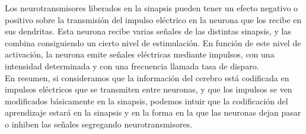 Los neurotransmisores liberados en la sinapsis pueden tener un efecto negativo o positivo sobre la transmisión del impulso eléctrico en la neurona que los recibe en sus dendritas. Esta neurona recibe varias señales de las distintas sinapsis, y las combina consiguiendo un cierto nivel de estimulación. En función de este nivel de activación, la neurona emite señales eléctricas mediante impulsos, con una intensidad determinada y con una frecuencia llamada tasa de disparo.\\
En resumen, si consideramos que la información del cerebro está codificada en impulsos eléctricos que se transmiten entre neuronas, y que los impulsos se ven modificados básicamente en la sinapsis, podemos intuir que la codificación del aprendizaje estará en la sinapsis y en la forma en la que las neuronas dejan pasar o inhiben las señales segregando neurotransmisores.

